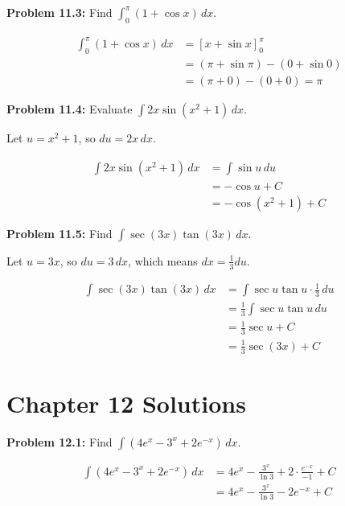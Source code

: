 \documentclass[12pt,a4paper]{book}
\theoremstyle{definition}
\begin{document}
\begin{solution}
\textbf{Problem 11.3:} Find $\int_0^{\pi} (1 + \cos x) \, dx$.

\begin{align}
\int_0^{\pi} (1 + \cos x) \, dx &= [x + \sin x]_0^{\pi}\\
&= (\pi + \sin \pi) - (0 + \sin 0)\\
&= (\pi + 0) - (0 + 0) = \pi
\end{align}
\end{solution}

\begin{solution}
\textbf{Problem 11.4:} Evaluate $\int 2x \sin(x^2 + 1) \, dx$.

Let $u = x^2 + 1$, so $du = 2x \, dx$.

\begin{align}
\int 2x \sin(x^2 + 1) \, dx &= \int \sin u \, du\\
&= -\cos u + C\\
&= -\cos(x^2 + 1) + C
\end{align}
\end{solution}

\begin{solution}
\textbf{Problem 11.5:} Find $\int \sec(3x) \tan(3x) \, dx$.

Let $u = 3x$, so $du = 3 \, dx$, which means $dx = \frac{1}{3} du$.

\begin{align}
\int \sec(3x) \tan(3x) \, dx &= \int \sec u \tan u \cdot \frac{1}{3} \, du\\
&= \frac{1}{3} \int \sec u \tan u \, du\\
&= \frac{1}{3} \sec u + C\\
&= \frac{1}{3} \sec(3x) + C
\end{align}
\end{solution}

\section*{Chapter 12 Solutions}

\begin{solution}
\textbf{Problem 12.1:} Find $\int (4e^x - 3^x + 2e^{-x}) \, dx$.

\begin{align}
\int (4e^x - 3^x + 2e^{-x}) \, dx &= 4e^x - \frac{3^x}{\ln 3} + 2 \cdot \frac{e^{-x}}{-1} + C\\
&= 4e^x - \frac{3^x}{\ln 3} - 2e^{-x} + C
\end{align}
\end{solution}
\end{document}
